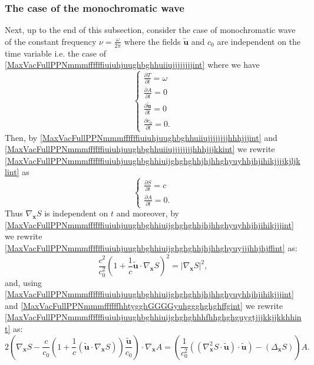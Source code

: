 \documentclass{article}
\theoremstyle{definition}
\theoremstyle{remark}
\renewcommand{\vec}[1]{\mathbf{#1}}
\newcommand{\er}{\eqref}
\newcommand{\er}{\eqref}
\begin{document}
\subsubsection{The case of the monochromatic wave}
Next, up to the end of this subsection, consider the case of
monochromatic wave of the constant frequency
$\nu=\frac{\omega}{2\pi}$ where the fields $\vec {\tilde u}$ and
$c_0$ are independent on the time variable i.e. the case of
\er{MaxVacFullPPNmmmffffffiuiuhjuughbghhuiiujjjjjjjjint} where we
have
\begin{equation}\label{MaxVacFullPPNmmmffffffiuiuhjuughbghhiuijghghghhjhjhhghyuyhhjhjihikjjjjkjljklint}
\begin{cases}
\frac{\partial T}{\partial t}=\omega\\
\frac{\partial A}{\partial t}=0\\
\frac{\partial \vec {\tilde u}}{\partial t}=0\\
\frac{\partial c_0}{\partial t}=0.
\end{cases}
\end{equation}
Then, by
\er{MaxVacFullPPNmmmffffffiuiuhjuughbghhuiiujjjjjjjjhhhjjjint} and
\er{MaxVacFullPPNmmmffffffiuiuhjuughbghhuiiujjjjjjjjhhhjjjkkint} we
rewrite
\er{MaxVacFullPPNmmmffffffiuiuhjuughbghhiuijghghghhjhjhhghyuyhhjhjihikjjjjkjljklint}
as
\begin{equation}\label{MaxVacFullPPNmmmffffffiuiuhjuughbghhiuijghghghhjhjhhghyuyhhjhjihikjjjint}
\begin{cases}
\frac{\partial S}{\partial t}=c\\
\frac{\partial A}{\partial t}=0.
\end{cases}
\end{equation}
Thus $\nabla_{\vec x}S$ is independent on $t$ and moreover, by
\er{MaxVacFullPPNmmmffffffiuiuhjuughbghhiuijghghghhjhjhhghyuyhhjhjihikjjjint}
we rewrite
\er{MaxVacFullPPNmmmffffffiuiuhjuughbghhiuijghghghhjhjhhghyuyjjjhhjhjffint}
as:
\begin{equation}\label{MaxVacFullPPNmmmffffffiuiuhjuughbghhiuijghghghhjhjhhghyuyiyyujjint}
\frac{c^2}{c^2_0}\left(1+\frac{1}{c}\vec {\tilde u}\cdot\nabla_\vec
x S\right)^2=\left|\nabla_\vec x S\right|^2,
\end{equation}
and, using
\er{MaxVacFullPPNmmmffffffiuiuhjuughbghhiuijghghghhjhjhhghyuyhhjhjihikjjjint}
and \er{MaxVacFullPPNmmmffffffhhtygghGGGGyuhggghghghffgint} we
rewrite
\er{MaxVacFullPPNmmmffffffiuiuhjuughbghhiuijghghghhhfhhghghguygtjjjkkjjkkhhint}
as:
\begin{equation}\label{MaxVacFullPPNmmmffffffiuiuhjuughbghhiuijghghghhhfhhghghguygtjuuujjint}
2\left(\nabla_{\vec x}S-\frac{c}{c_0}\left(1+\frac{1}{c}\left(\vec
{\tilde u}\cdot\nabla_{\vec x}S\right)\right)\frac{\vec {\tilde
u}}{c_0}\right)\cdot\nabla_{\vec
x}A=\left(\frac{1}{c^2_0}\left(\left(\nabla^2_{\vec x}S\cdot\vec
{\tilde u}\right)\cdot\vec {\tilde u}\right)-\left(\Delta_{\vec
x}S\right)\right)A.
\end{equation}
\end{document}
